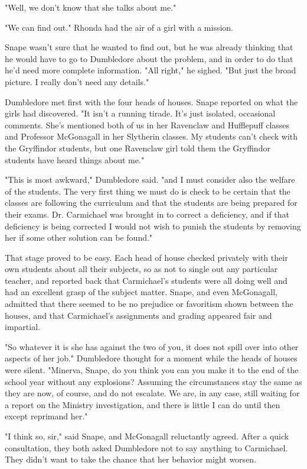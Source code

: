 \documentclass[a4paper,11pt]{article}
\begin{document}
"Well, we don't know that she talks about me."

"We can find out." Rhonda had the air of a girl with a mission.

Snape wasn't sure that he wanted to find out, but he was already thinking that he would have to go to Dumbledore about the problem, and in order to do that he'd need more complete information. "All right," he sighed. "But just the broad picture. I really don't need any details."

Dumbledore met first with the four heads of houses. Snape reported on what the girls had discovered. "It isn't a running tirade. It's just isolated, occasional comments. She's mentioned both of us in her Ravenclaw and Hufflepuff classes and Professor McGonagall in her Slytherin classes. My students can't check with the Gryffindor students, but one Ravenclaw girl told them the Gryffindor students have heard things about me."

"This is most awkward," Dumbledore said. "and I must consider also the welfare of the students. The very first thing we must do is check to be certain that the classes are following the curriculum and that the students are being prepared for their exams. Dr. Carmichael was brought in to correct a deficiency, and if that deficiency is being corrected I would not wish to punish the students by removing her if some other solution can be found."

That stage proved to be easy. Each head of house checked privately with their own students about all their subjects, so as not to single out any particular teacher, and reported back that Carmichael's students were all doing well and had an excellent grasp of the subject matter. Snape, and even McGonagall, admitted that there seemed to be no prejudice or favoritism shown between the houses, and that Carmichael's assignments and grading appeared fair and impartial.

"So whatever it is she has against the two of you, it does not spill over into other aspects of her job." Dumbledore thought for a moment while the heads of houses were silent. "Minerva, Snape, do you think you can you make it to the end of the school year without any explosions? Assuming the circumstances stay the same as they are now, of course, and do not escalate. We are, in any case, still waiting for a report on the Ministry investigation, and there is little I can do until then except reprimand her."

"I think so, sir," said Snape, and McGonagall reluctantly agreed. After a quick consultation, they both asked Dumbledore not to say anything to Carmichael. They didn't want to take the chance that her behavior might worsen.
\end{document}
